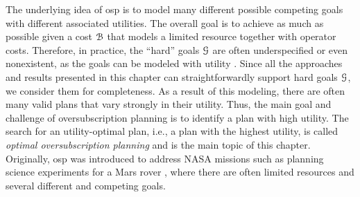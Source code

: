 The underlying idea of osp is to model many different possible competing goals with different associated utilities.
The overall goal is to achieve as much as possible given a cost $\mathcal B$ that models a limited resource together with operator costs.
Therefore, in practice, the ``hard'' goals $\mathcal G$ are often underspecified or even nonexistent, as the goals can be modeled with utility \autocite{katz-et-al-zenodo2019,katz-et-al-icaps2019}.
Since all the approaches and results presented in this chapter can straightforwardly support hard goals $\mathcal G$, we consider them for completeness.
As a result of this modeling, there are often many valid plans that vary strongly in their utility. 
Thus, the main goal and challenge of oversubscription planning is to identify a plan with high utility.
The search for an utility-optimal plan, i.e., a plan with the highest utility, is called \emph{optimal oversubscription planning} and is the main topic of this chapter.
Originally, osp was introduced to address NASA missions such as planning science experiments for a Mars rover \autocite{smith-icaps2004}, where there are often limited resources and several different and competing goals.

